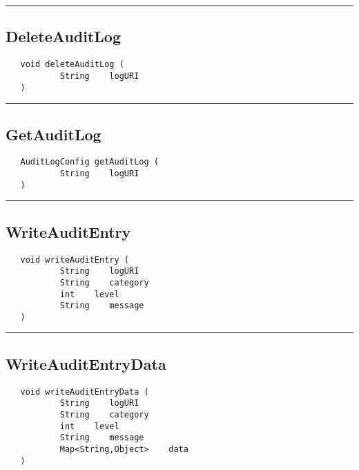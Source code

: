 \rule{15cm}{2pt}
\subsection{DeleteAuditLog}
\label{Api:DeleteAuditLog}
\begin{verbatim}
   void deleteAuditLog (
           String    logURI
   )
\end{verbatim}



\rule{15cm}{2pt}
\subsection{GetAuditLog}
\label{Api:GetAuditLog}
\begin{verbatim}
   AuditLogConfig getAuditLog (
           String    logURI
   )
\end{verbatim}



\rule{15cm}{2pt}
\subsection{WriteAuditEntry}
\label{Api:WriteAuditEntry}
\begin{verbatim}
   void writeAuditEntry (
           String    logURI
           String    category
           int    level
           String    message
   )
\end{verbatim}



\rule{15cm}{2pt}
\subsection{WriteAuditEntryData}
\label{Api:WriteAuditEntryData}
\begin{verbatim}
   void writeAuditEntryData (
           String    logURI
           String    category
           int    level
           String    message
           Map<String,Object>    data
   )
\end{verbatim}



